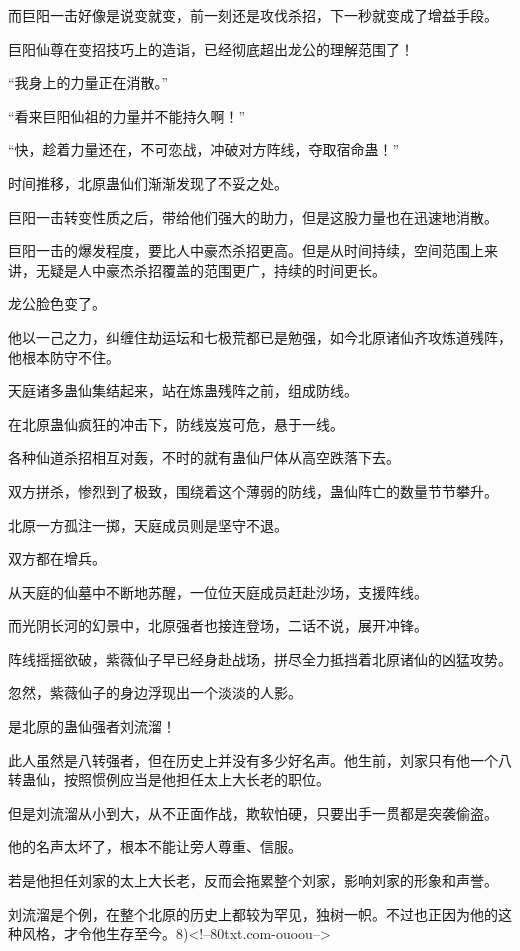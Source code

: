 \begin{this_body}
而巨阳一击好像是说变就变，前一刻还是攻伐杀招，下一秒就变成了增益手段。

巨阳仙尊在变招技巧上的造诣，已经彻底超出龙公的理解范围了！

“我身上的力量正在消散。”

“看来巨阳仙祖的力量并不能持久啊！”

“快，趁着力量还在，不可恋战，冲破对方阵线，夺取宿命蛊！”

时间推移，北原蛊仙们渐渐发现了不妥之处。

巨阳一击转变性质之后，带给他们强大的助力，但是这股力量也在迅速地消散。

巨阳一击的爆发程度，要比人中豪杰杀招更高。但是从时间持续，空间范围上来讲，无疑是人中豪杰杀招覆盖的范围更广，持续的时间更长。

龙公脸色变了。

他以一己之力，纠缠住劫运坛和七极荒都已是勉强，如今北原诸仙齐攻炼道残阵，他根本防守不住。

天庭诸多蛊仙集结起来，站在炼蛊残阵之前，组成防线。

在北原蛊仙疯狂的冲击下，防线岌岌可危，悬于一线。

各种仙道杀招相互对轰，不时的就有蛊仙尸体从高空跌落下去。

双方拼杀，惨烈到了极致，围绕着这个薄弱的防线，蛊仙阵亡的数量节节攀升。

北原一方孤注一掷，天庭成员则是坚守不退。

双方都在增兵。

从天庭的仙墓中不断地苏醒，一位位天庭成员赶赴沙场，支援阵线。

而光阴长河的幻景中，北原强者也接连登场，二话不说，展开冲锋。

阵线摇摇欲破，紫薇仙子早已经身赴战场，拼尽全力抵挡着北原诸仙的凶猛攻势。

忽然，紫薇仙子的身边浮现出一个淡淡的人影。

是北原的蛊仙强者刘流溜！

此人虽然是八转强者，但在历史上并没有多少好名声。他生前，刘家只有他一个八转蛊仙，按照惯例应当是他担任太上大长老的职位。

但是刘流溜从小到大，从不正面作战，欺软怕硬，只要出手一贯都是突袭偷盗。

他的名声太坏了，根本不能让旁人尊重、信服。

若是他担任刘家的太上大长老，反而会拖累整个刘家，影响刘家的形象和声誉。

刘流溜是个例，在整个北原的历史上都较为罕见，独树一帜。不过也正因为他的这种风格，才令他生存至今。8)<!--80txt.com-ouoou-->

\end{this_body}

